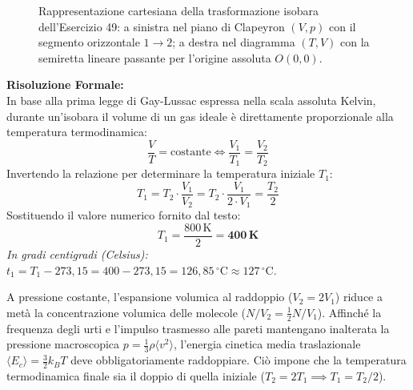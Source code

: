 \documentclass[11pt,a4paper,oneside]{report}
\begin{document}
\begin{problema}
\begin{figure}[H]
\caption{Rappresentazione cartesiana della trasformazione isobara dell'Esercizio 49: a sinistra nel piano di Clapeyron $(V, p)$ con il segmento orizzontale $1 \to 2$; a destra nel diagramma $(T, V)$ con la semiretta lineare passante per l'origine assoluta $O(0, 0)$.}
\label{fig:es49_grafici}
\end{figure}

\textbf{Risoluzione Formale:}\\
In base alla prima legge di Gay-Lussac espressa nella scala assoluta Kelvin, durante un'isobara il volume di un gas ideale \`e direttamente proporzionale alla temperatura termodinamica:
\[
\frac{V}{T} = \text{costante} \iff \frac{V_1}{T_1} = \frac{V_2}{T_2}
\]
Invertendo la relazione per determinare la temperatura iniziale $T_1$:
\[
T_1 = T_2 \cdot \frac{V_1}{V_2} = T_2 \cdot \frac{V_1}{2 \cdot V_1} = \frac{T_2}{2}
\]
Sostituendo il valore numerico fornito dal testo:
\[
T_1 = \frac{800\,\text{K}}{2} = \mathbf{400\,\text{K}}
\]
\textit{In gradi centigradi (Celsius):} $t_1 = T_1 - 273{,}15 = 400 - 273{,}15 = 126{,}85\,^\circ\text{C} \approx 127\,^\circ\text{C}$.

\begin{commento}
A pressione costante, l'espansione volumica al raddoppio ($V_2 = 2V_1$) riduce a met\`a la concentrazione volumica delle molecole ($N/V_2 = \frac{1}{2} N/V_1$). Affinch\'e la frequenza degli urti e l'impulso trasmesso alle pareti mantengano inalterata la pressione macroscopica $p = \frac{1}{3}\rho \langle v^2 \rangle$, l'energia cinetica media traslazionale $\langle E_c \rangle = \frac{3}{2}k_B T$ deve obbligatoriamente raddoppiare. Ci\`o impone che la temperatura termodinamica finale sia il doppio di quella iniziale ($T_2 = 2T_1 \implies T_1 = T_2 / 2$).
\end{commento}
\end{problema}
\end{document}
